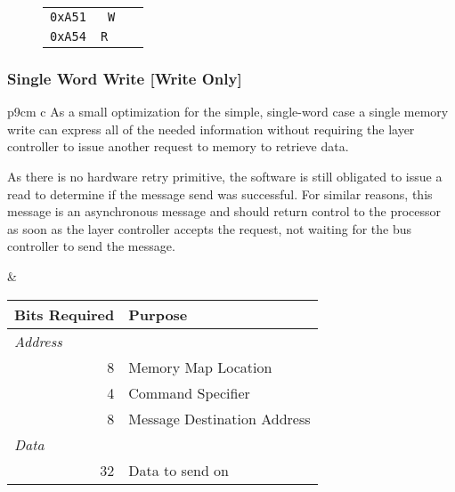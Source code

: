 \begin{figure}[!h]
\begin{tabular}{ c|c|l }
  {\tt 0xA51} & \tt ~W & \nameref{reg-tx-single} \\
  {\tt 0xA54} & \tt R~ & \nameref{reg-rx-single} \\
\end{tabular}
\end{figure}

\subsubsection{Single Word Write [Write Only]}
\label{scratch:reg-tx-single}
\begin{tabular}{p{9cm} c}
\vspace{-4em}
As a small optimization for the simple, single-word case a single memory write
can express all of the needed information without requiring the layer
controller to issue another request to memory to retrieve data.

As there is no hardware retry primitive, the software is still obligated to
issue a read to determine if the message send was successful. For similar
reasons, this message is an asynchronous message and should return control to
the processor as soon as the layer controller accepts the request, not waiting
for the bus controller to send the message.

&

\begin{tabular}{r l}
  Bits Required & Purpose \\
  \hline
  \hline
  \multicolumn{1}{l}{\em Address} & \\
  8 & \bus Memory Map Location \\
  4 & Command Specifier \\
  8 & Message Destination Address \\
  \multicolumn{1}{l}{\em Data} & \\
  32 & Data to send on \bus \\
\end{tabular}

\\
\end{tabular}

